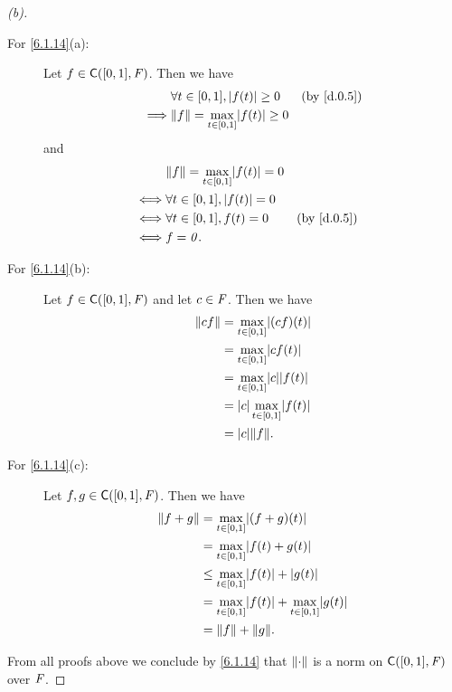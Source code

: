 \begin{proof}[(b)]
  \begin{description}
    \item[For \cref{6.1.14}(a):]
      Let \(f \in \cfs([0, 1], \F)\).
      Then we have
      \begin{align*}
                 & \forall t \in [0, 1], \abs{f(t)} \geq 0          &  & \text{(by \cref{d.0.5})} \\
        \implies & \norm{f} = \max_{t \in [0, 1]} \abs{f(t)} \geq 0
      \end{align*}
      and
      \begin{align*}
             & \norm{f} = \max_{t \in [0, 1]} \abs{f(t)} = 0                               \\
        \iff & \forall t \in [0, 1], \abs{f(t)} = 0                                        \\
        \iff & \forall t \in [0, 1], f(t) = 0                &  & \text{(by \cref{d.0.5})} \\
        \iff & f = \zv.
      \end{align*}
    \item[For \cref{6.1.14}(b):]
      Let \(f \in \cfs([0, 1], \F)\) and let \(c \in \mathit{F}\).
      Then we have
      \begin{align*}
        \norm{cf} & = \max_{t \in [0, 1]} \abs{(cf)(t)}      \\
                  & = \max_{t \in [0, 1]} \abs{cf(t)}        \\
                  & = \max_{t \in [0, 1]} \abs{c} \abs{f(t)} \\
                  & = \abs{c} \max_{t \in [0, 1]} \abs{f(t)} \\
                  & = \abs{c} \norm{f}.
      \end{align*}
    \item[For \cref{6.1.14}(c):]
      Let \(f, g \in \cfs([0, 1], \F)\).
      Then we have
      \begin{align*}
        \norm{f + g} & = \max_{t \in [0, 1]} \abs{(f + g)(t)}                            \\
                     & = \max_{t \in [0, 1]} \abs{f(t) + g(t)}                           \\
                     & \leq \max_{t \in [0, 1]} \abs{f(t)} + \abs{g(t)}                  \\
                     & = \max_{t \in [0, 1]} \abs{f(t)} + \max_{t \in [0, 1]} \abs{g(t)} \\
                     & = \norm{f} + \norm{g}.
      \end{align*}
  \end{description}
  From all proofs above we conclude by \cref{6.1.14} that \(\left\lVert\cdot\right\rVert\) is a norm on \(\cfs([0, 1], \F)\) over \(\mathit{F}\).
\end{proof}


